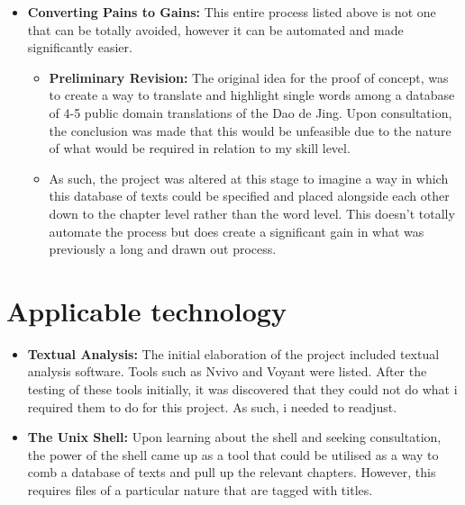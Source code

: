 \documentclass{article}
\begin{document}
\begin{itemize}

\item{\textbf{Converting Pains to Gains:} This entire process listed above is not one that can be totally avoided, however it can be automated and made significantly easier.}

\begin{itemize}

\item{\textbf{Preliminary Revision:} The original idea for the proof of concept, was to create a way to translate and highlight single words among a database of 4-5 public domain translations of the Dao de Jing. Upon consultation, the conclusion was made that this would be unfeasible due to the nature of what would be required in relation to my skill level.}

\item{As such, the project was altered at this stage to imagine a way in which this database of texts could be specified and placed alongside each other down to the chapter level rather than the word level. This doesn't totally automate the process but does create a significant gain in what was previously a long and drawn out process.}


\end{itemize}

\end{itemize}

\section{Applicable technology}

\begin{itemize}

\item{\textbf{Textual Analysis:} The initial elaboration of the project included textual analysis software. Tools such as Nvivo and Voyant were listed. After the testing of these tools initially, it was discovered that they could not do what i required them to do for this project. As such, i needed to readjust.}

\item{\textbf{The Unix Shell:} Upon learning about the shell and seeking consultation, the power of the shell came up as a tool that could be utilised as a way to comb a database of texts and pull up the relevant chapters. However, this requires files of a particular nature that are tagged with titles.}

\end{itemize}
\end{document}
